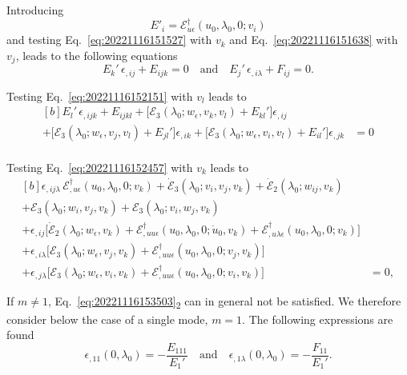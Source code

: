 \documentclass[12pt, final]{scrartcl}
\theoremstyle{definition}
\newcommand{\E}{\mathcal E}
\newcommand{\EE}{\mathcal E ^ \dagger}
\begin{document}
Introducing
\begin{equation}
  E'_i = \EE_{u\epsilon}(u_0, \lambda_0, 0; v_i)
\end{equation}
and testing Eq.~\eqref{eq:20221116151527} with \(v_k\) and Eq.~\eqref{eq:20221116151638} with \(v_j\), leads to the
following equations
\begin{equation}
  \label{eq:20221116153503}
  E_k' \, \epsilon_{,ij} + E_{ijk} = 0 \quad \text{and} \quad   E_j' \, \epsilon_{,i\lambda} + F_{ij} = 0.
\end{equation}

Testing Eq.~\eqref{eq:20221116152151} with \(v_l\) leads to
\begin{equation}
  \begin{aligned}[b]
     E_l' \, \epsilon_{,ijk} + E_{ijkl} + \bigl[ \E_3(\lambda_0; w_\epsilon, v_k, v_l) + E_{kl}' \bigr] \epsilon_{,ij} &\\
    + \bigl[ \E_3(\lambda_0;  w_\epsilon, v_j, v_l) + E_{jl}' \bigr] \epsilon_{,ik} + \bigl[ \E_3(\lambda_0; w_\epsilon, v_i, v_l) + E_{il}' \bigr] \epsilon_{,jk} &= 0\\
  \end{aligned}
\end{equation}

Testing Eq.~\eqref{eq:20221116152457} with \(v_k\) leads to
\begin{equation}
  \begin{aligned}[b]
    \epsilon_{,ij\lambda} \, \EE_{,u\epsilon}(u_0, \lambda_0, 0; v_k) + \dot{\E}_3(\lambda_0; v_i, v_j, v_k) + \dot{\E}_2(\lambda_0; w_{ij}, v_k) &\\
    + \E_3(\lambda_0; w_i, v_j, v_k) + \E_3(\lambda_0; v_i, w_j, v_k) &\\
    + \epsilon_{,ij} \bigl[ \dot{\E}_2(\lambda_0; w_\epsilon, v_k) + \EE_{,uu\epsilon}(u_0, \lambda_0, 0; \dot{u}_0, v_k) + \EE_{,u\lambda\epsilon}(u_0, \lambda_0, 0; v_k)\bigr] &\\
    + \epsilon_{,i\lambda} \bigl[ \E_3(\lambda_0; w_\epsilon, v_j, v_k) + \EE_{,uu\epsilon}(u_0, \lambda_0, 0; v_j, v_k) \bigr] &\\
    + \epsilon_{,j\lambda} \bigl[ \E_3(\lambda_0; w_\epsilon, v_i, v_k) + \EE_{,uu\epsilon}(u_0, \lambda_0, 0; v_i, v_k) \bigr] &= 0,
  \end{aligned}
\end{equation}


If \(m \neq 1\), Eq.~\eqref{eq:20221116153503}\textsubscript{2} can in general not be satisfied. We therefore consider
below the case of a single mode, \(m=1\). The following expressions are found
\begin{equation}
  \label{eq:20221116153503}
   \epsilon_{,11}(0, \lambda_0) = -\frac{E_{111}}{E_1'} \quad \text{and} \quad \epsilon_{,1\lambda}(0, \lambda_0) = -\frac{F_{11}}{E_1'}.
\end{equation}
\end{document}

